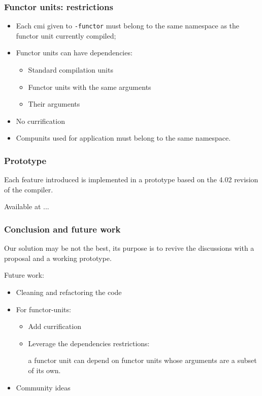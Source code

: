 \documentclass{beamer}
\begin{document}
\begin{frame}
\frametitle{Functor units: restrictions}
\begin{itemize}[<+->]
\item Each cmi given to \texttt{-functor} must belong to the same namespace as
  the functor unit currently compiled;
\item Functor units can have dependencies:
  \begin{itemize}
    \item Standard compilation units
    \item Functor units with the \alert{same arguments}
    \item Their arguments
  \end{itemize}
\item No currification
\item Compunits used for application must belong to the same namespace.
\end{itemize}
\end{frame}

\begin{frame}
\frametitle{Prototype}

Each feature introduced is implemented in a prototype based on the 4.02
revision of the compiler.

Available at ... 
\end{frame}

\begin{frame}
\frametitle{Conclusion and future work}

Our solution may be not the best, its purpose is to revive the discussions with
a proposal and a working prototype. 

\medskip

Future work:
\begin{itemize}
  \item Cleaning and refactoring the code
  \item For functor-units:
    \begin{itemize}
      \item Add currification
      \item Leverage the dependencies restrictions:

        a functor unit can depend on functor units whose arguments are a subset
        of its own.
    \end{itemize}
  \item Community ideas
\end{itemize}
\end{frame}
\end{document}
